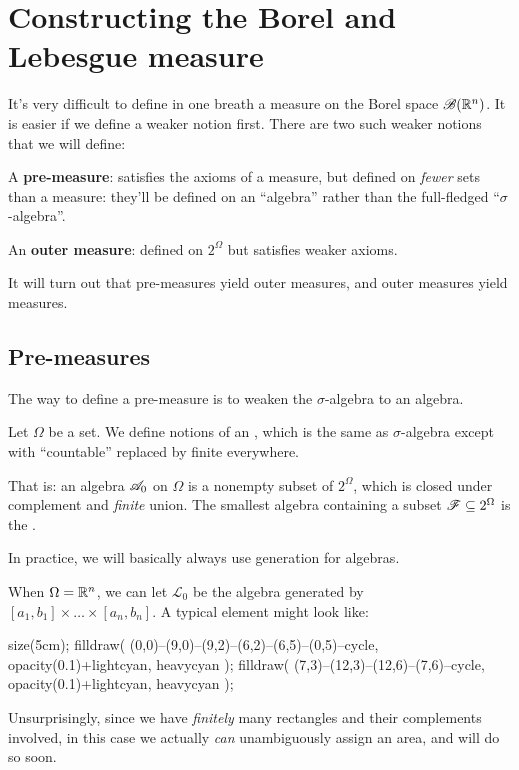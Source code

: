 \chapter{Constructing the Borel and Lebesgue measure}
\label{ch:caratheodory_measure}
It's very difficult to define in one breath a measure
on the Borel space $\mathscr B(\mathbb R^n)$.
It is easier if we define a weaker notion first.
There are two such weaker notions that we will define:
\begin{itemize}
	\ii A \textbf{pre-measure}:
	satisfies the axioms of a measure,
	but defined on \emph{fewer} sets than a measure:
	they'll be defined on an ``algebra''
	rather than the full-fledged ``$\sigma$-algebra''.

	\ii An \textbf{outer measure}:
	defined on $2^\Omega$ but satisfies weaker axioms.
\end{itemize}
It will turn out that pre-measures yield outer measures,
and outer measures yield measures.


\section{Pre-measures}
The way to define a pre-measure is to weaken
the $\sigma$-algebra to an algebra.
\begin{definition}
	Let $\Omega$ be a set.
	We define notions of an ,
	which is the same as $\sigma$-algebra except
	with ``countable'' replaced by finite everywhere.

	That is: an algebra $\mathscr A_0$ on $\Omega$ is a
	nonempty subset of $2^\Omega$,
	which is closed under complement and \emph{finite} union.
	The smallest algebra containing a subset $\mathscr F \subseteq 2^\Omega$
	is the .
\end{definition}
In practice, we will basically always use generation for algebras.
\begin{example}
	When $\Omega = \mathbb R^n$,
	we can let $\mathcal{L}_0$ be the algebra generated by
	$[a_1, b_1] \times \dots \times [a_n, b_n]$.
	A typical element might look like:
	\begin{center}
	\begin{asy}
		size(5cm);
		filldraw( (0,0)--(9,0)--(9,2)--(6,2)--(6,5)--(0,5)--cycle,
			opacity(0.1)+lightcyan, heavycyan );
		filldraw( (7,3)--(12,3)--(12,6)--(7,6)--cycle,
			opacity(0.1)+lightcyan, heavycyan );
	\end{asy}
	\end{center}
	Unsurprisingly, since we have \emph{finitely} many
	rectangles and their complements involved,
	in this case we actually \emph{can}
	unambiguously assign an area, and will do so soon.
\end{example}

